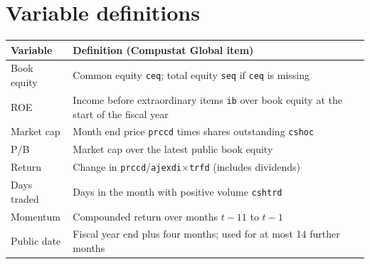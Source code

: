 \documentclass[11pt]{article}
\begin{document}
\appendix
\section{Variable definitions}

\begin{tabular}{p{}p{}}
\toprule
Variable & Definition (Compustat Global item) \\
\midrule
Book equity & Common equity \texttt{ceq}; total equity \texttt{seq} if \texttt{ceq} is missing \\
ROE & Income before extraordinary items \texttt{ib} over book equity at the start of the fiscal year \\
Market cap & Month end price \texttt{prccd} times shares outstanding \texttt{cshoc} \\
P/B & Market cap over the latest public book equity \\
Return & Change in \texttt{prccd}/\texttt{ajexdi}$\times$\texttt{trfd} (includes dividends) \\
Days traded & Days in the month with positive volume \texttt{cshtrd} \\
Momentum & Compounded return over months $t-11$ to $t-1$ \\
Public date & Fiscal year end plus four months; used for at most 14 further months \\
\bottomrule
\end{tabular}
\end{document}
